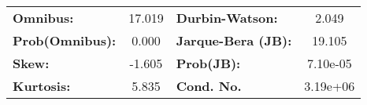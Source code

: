     \begin{center}
    \begin{tabular}{lclc}
    \toprule
    \textbf{Omnibus:}       & 17.019 & \textbf{  Durbin-Watson:     } &    2.049  \\
    \textbf{Prob(Omnibus):} &  0.000 & \textbf{  Jarque-Bera (JB):  } &   19.105  \\
    \textbf{Skew:}          & -1.605 & \textbf{  Prob(JB):          } & 7.10e-05  \\
    \textbf{Kurtosis:}      &  5.835 & \textbf{  Cond. No.          } & 3.19e+06  \\
    \bottomrule
    \end{tabular}
    \end{center}
